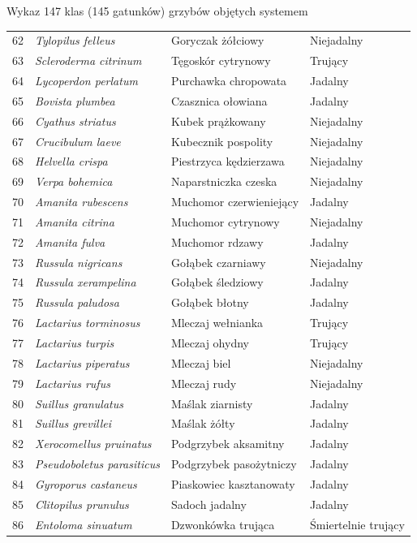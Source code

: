 \begin{easyappendix}{Wykaz 147 klas (145 gatunków) grzybów objętych systemem}
\begin{longtable}{|r|l|l|l|}
62 & \textit{Tylopilus felleus} & Goryczak żółciowy & Niejadalny \\
63 & \textit{Scleroderma citrinum} & Tęgoskór cytrynowy & Trujący \\
64 & \textit{Lycoperdon perlatum} & Purchawka chropowata & Jadalny \\
65 & \textit{Bovista plumbea} & Czasznica ołowiana & Jadalny \\
66 & \textit{Cyathus striatus} & Kubek prążkowany & Niejadalny \\
67 & \textit{Crucibulum laeve} & Kubecznik pospolity & Niejadalny \\
68 & \textit{Helvella crispa} & Piestrzyca kędzierzawa & Niejadalny \\
69 & \textit{Verpa bohemica} & Naparstniczka czeska & Niejadalny\\
70 & \textit{Amanita rubescens} & Muchomor czerwieniejący & Jadalny \\
71 & \textit{Amanita citrina} & Muchomor cytrynowy & Niejadalny \\
72 & \textit{Amanita fulva} & Muchomor rdzawy & Jadalny \\
73 & \textit{Russula nigricans} & Gołąbek czarniawy & Niejadalny \\
74 & \textit{Russula xerampelina} & Gołąbek śledziowy & Jadalny \\
75 & \textit{Russula paludosa} & Gołąbek błotny & Jadalny \\
76 & \textit{Lactarius torminosus} & Mleczaj wełnianka & Trujący\\
77 & \textit{Lactarius turpis} & Mleczaj ohydny & Trujący\\
78 & \textit{Lactarius piperatus} & Mleczaj biel & Niejadalny \\
79 & \textit{Lactarius rufus} & Mleczaj rudy & Niejadalny \\
80 & \textit{Suillus granulatus} & Maślak ziarnisty & Jadalny \\
81 & \textit{Suillus grevillei} & Maślak żółty & Jadalny \\
82 & \textit{Xerocomellus pruinatus} & Podgrzybek aksamitny & Jadalny \\
83 & \textit{Pseudoboletus parasiticus} & Podgrzybek pasożytniczy & Jadalny \\
84 & \textit{Gyroporus castaneus} & Piaskowiec kasztanowaty & Jadalny \\
85 & \textit{Clitopilus prunulus} & Sadoch jadalny & Jadalny \\
86 & \textit{Entoloma sinuatum} & Dzwonkówka trująca & Śmiertelnie trujący \\

\end{longtable}
\end{easyappendix}
